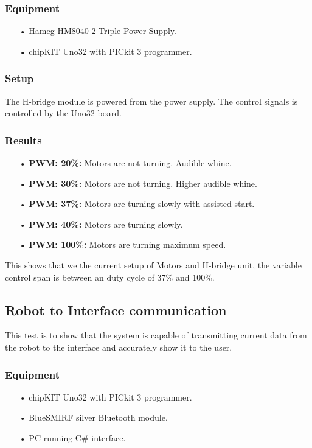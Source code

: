 \subsubsection{Equipment}
\begin{enumerate}
	\item[•]Hameg HM8040-2 Triple Power Supply.
	\item[•]chipKIT Uno32 with PICkit 3 programmer.
\end{enumerate}

\subsubsection{Setup}
	The H-bridge module is powered from the power supply.
	The control signals is controlled by the Uno32 board.

\subsubsection{Results}
\begin{enumerate}
	\item[•]\textbf{PWM: 20\%:} Motors are not turning. Audible whine.
	\item[•]\textbf{PWM: 30\%:} Motors are not turning. Higher audible whine.
	\item[•]\textbf{PWM: 37\%:} Motors are turning slowly with assisted start.
	\item[•]\textbf{PWM: 40\%:} Motors are turning slowly.
	\item[•]\textbf{PWM: 100\%:} Motors are turning maximum speed.
\end{enumerate}
This shows that we the current setup of Motors and H-bridge unit, the variable control span is between an duty cycle of 37\% and 100\%.

\subsection{Robot to Interface communication}
This test is to show that the system is capable of transmitting current data from the robot to the interface and accurately show it to the user.

\subsubsection{Equipment}
\begin{enumerate}
	\item[•]chipKIT Uno32 with PICkit 3 programmer.
	\item[•]BlueSMIRF silver Bluetooth module.
	\item[•]PC running C# interface.
\end{enumerate}

